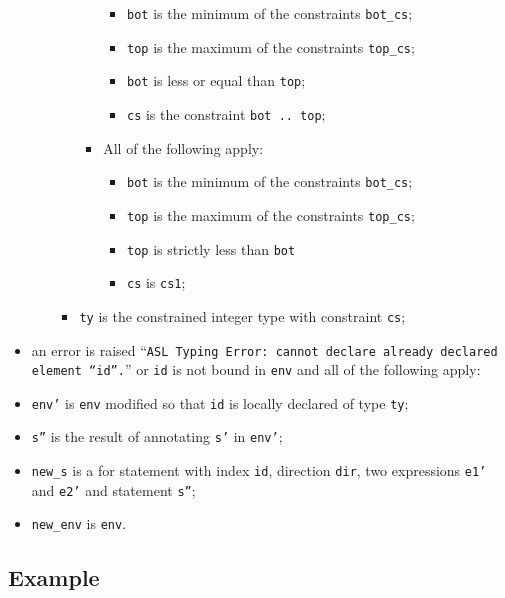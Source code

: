\documentclass{book}
\begin{document}
\begin{itemize}
\begin{itemize}
\begin{itemize}
\begin{itemize}
                 \begin{itemize}
                   \item \texttt{bot} is the minimum of the constraints \texttt{bot\_cs};
                   \item \texttt{top} is the maximum of the constraints \texttt{top\_cs};
                   \item \texttt{bot} is less or equal than \texttt{top};
                   \item \texttt{cs} is the constraint \texttt{bot .. top};
                 \end{itemize}
               \item All of the following apply:
                 \begin{itemize}
                   \item \texttt{bot} is the minimum of the constraints \texttt{bot\_cs};
                   \item \texttt{top} is the maximum of the constraints \texttt{top\_cs};
                   \item \texttt{top} is strictly less than \texttt{bot}
                   \item \texttt{cs} is \texttt{cs1};
                 \end{itemize}
             \end{itemize}
           \item \texttt{ty} is the constrained integer type with constraint \texttt{cs};
         \end{itemize}
     \end{itemize}
   \item an error is raised ``\texttt{ASL Typing Error: cannot declare already declared element “id”.}'' or \texttt{id} is not bound in \texttt{env} and all of the following apply:
   \item \texttt{env'} is \texttt{env} modified so that \texttt{id} is locally declared of type \texttt{ty};
   \item \texttt{s''} is the result of annotating \texttt{s'} in \texttt{env'};
   \item \texttt{new\_s} is a for statement with index \texttt{id}, direction \texttt{dir}, two expressions \texttt{e1'} and \texttt{e2'} and statement \texttt{s''};
   \item \texttt{new\_env} is \texttt{env}.
   \end{itemize}

  \subsection{Example}
\end{document}
